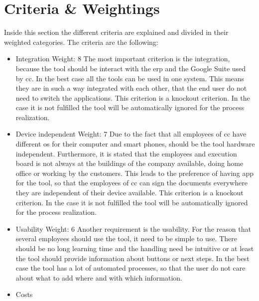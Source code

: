 \section{Criteria \& Weightings} \label{tool:sec:criteria}
Inside this section the different criteria are explained and divided in their
weighted categories. The criteria are the following:
\begin{itemize}
	\item Integration \newline
	Weight: 8 \newline
		The most important criterion is the integration, because the tool should be interact with the \gls{erp} and the Google Suite used by \gls{cc}. In the best case all the tools can be used in one system. This means they are in such a way integrated with each other, that the end user do not need to switch the applications. \newline
		This criterion is a knockout criterion. In the case it is not fulfilled the tool will be automatically ignored for the process realization. 
	\item Device independent \newline
	Weight: 7 \newline
	Due to the fact that all employees of \gls{cc} have different \gls{os} for their computer and smart phones, should be the tool hardware independent. Furthermore, it is stated that the employees and execution board is not always at the buildings of the company available, doing home office or working by the customers. This leads to the preference of having \gls{app} for the tool, so that the employees of \gls{cc} can sign the documents everywhere they are independent of their device available.\newline
	This criterion is a knockout criterion. In the case it is not fulfilled the tool will be automatically ignored for the process realization. 
	\item Usability \newline
	Weight: 6 \newline
	Another requirement is the usability. For the reason that several employees should use the tool, it need to be simple to use. There should be no long learning time and the handling need be intuitive or at least the tool should provide information about buttons or next steps. In the best case the tool has a lot of automated processes, so that the user do not care about what to add where and with which information.
	\item Costs \newline

\end{itemize}
